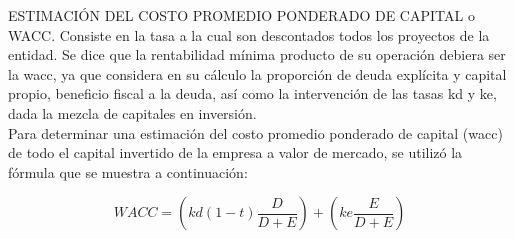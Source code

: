 \textcolor{secundario}{ESTIMACI\'ON DEL COSTO PROMEDIO PONDERADO DE CAPITAL o WACC.} Consiste en la tasa a la cual son descontados todos los proyectos de la entidad. Se dice que la rentabilidad m\'inima producto de su operaci\'on debiera ser la \gls{wacc}, ya que considera en su c\'alculo la proporci\'on de deuda expl\'icita y capital propio, beneficio fiscal a la deuda, as\'i como la intervenci\'on de las tasas \gls{kd} y \gls{ke}, dada la mezcla de capitales en inversi\'on.\\[5pt]

Para determinar una estimaci\'on del costo promedio ponderado de capital (\gls{wacc}) de todo el capital invertido de la empresa a valor de mercado, se utiliz\'o la f\'ormula que se muestra a continuaci\'on:

$$WACC=\left(kd(1-t)\frac{D}{D+E}\right)+\left(ke\frac{E}{D+E}\right)$$